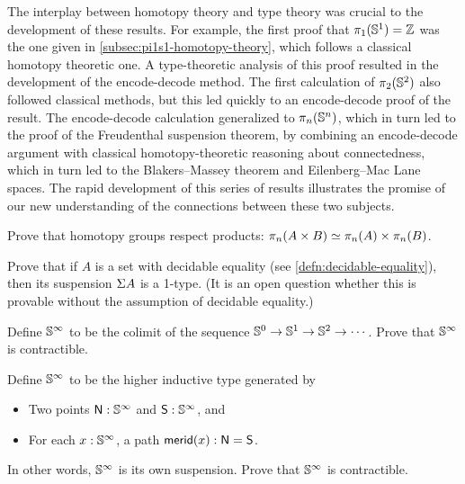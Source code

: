 The interplay between homotopy theory and type theory was crucial to the
development of these results.  For example, the first proof that
$\pi_1(\mathbb{S} ^1)=\mathbb{Z}$ was the one given in \autoref{subsec:pi1s1-homotopy-theory}, which follows a classical homotopy theoretic one.  A
type-theoretic analysis of this proof resulted in the development of the
encode-decode method.  The first calculation of $\pi_2(\mathbb{S} ^2)$ also followed
classical methods, but this led quickly to an encode-decode proof of the
result.  The encode-decode calculation generalized to $\pi_n(\mathbb{S} ^n)$, which
in turn led to the proof of the Freudenthal suspension theorem, by
combining an encode-decode argument with classical homotopy-theoretic
reasoning about connectedness, which in turn led to the Blakers--Massey
theorem and Eilenberg--Mac Lane spaces.  The rapid development of this
series of results illustrates the promise of our new understanding of
the connections between these two subjects.

\sectionExercises

\begin{ex}
  Prove that homotopy groups respect products: $\pi_n(A\times B) \simeq \pi_n(A)\times \pi_n(B)$.
\end{ex}

\begin{ex}
  Prove that if $A$ is a set with decidable equality (see \autoref{defn:decidable-equality}), then its suspension $\Sigma A$ is a 1-type.
  (It is an open question whether this is provable without the assumption of decidable equality.)
\end{ex}

\begin{ex}
  Define $\mathbb{S}^\infty$ to be the colimit of the sequence $\mathbb{S}^0 \to \mathbb{S}^1 \to \mathbb{S}^2 \to\cdots$.
  Prove that $\mathbb{S}^\infty$ is contractible.
\end{ex}

\begin{ex}
  Define $\mathbb{S}^\infty$ to be the higher inductive type generated by
  \begin{itemize}
  \item Two points $\mathsf{N}:\mathbb{S}^\infty$ and $\mathsf{S}:\mathbb{S}^\infty$, and
  \item For each $x:\mathbb{S}^\infty$, a path $\mathsf{merid}(x):\mathsf{N}=\mathsf{S}$.
  \end{itemize}
  In other words, $\mathbb{S}^\infty$ is its own suspension.
  Prove that $\mathbb{S}^\infty$ is contractible.
\end{ex}

